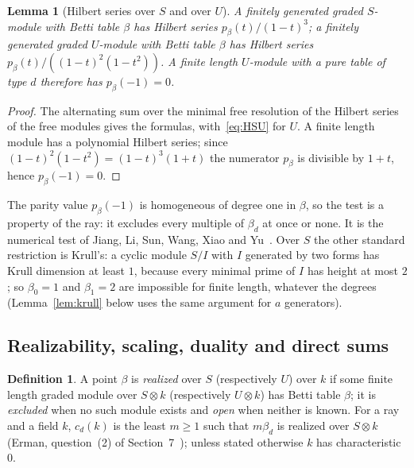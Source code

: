 \documentclass[11pt]{article}
\newtheorem{lemma}{Lemma}
\theoremstyle{definition}
\newtheorem{definition}{Definition}
\theoremstyle{remark}
\begin{document}
\begin{lemma}[Hilbert series over $S$ and over $U$]\label{lem:parity}
A finitely generated graded $S$-module with Betti table $\beta$ has Hilbert series $p_\beta(t)/(1-t)^3$; a finitely generated graded $U$-module with Betti table $\beta$ has Hilbert series $p_\beta(t)/((1-t)^2(1-t^2))$. A finite length $U$-module with a pure table of type $d$ therefore has $p_\beta(-1)=0$.
\end{lemma}
\begin{proof}
The alternating sum over the minimal free resolution of the Hilbert series of the free modules gives the formulas, with~\eqref{eq:HSU} for $U$. A finite length module has a polynomial Hilbert series; since $(1-t)^2(1-t^2)=(1-t)^3(1+t)$ the numerator $p_\beta$ is divisible by $1+t$, hence $p_\beta(-1)=0$.
\end{proof}

The parity value $p_\beta(-1)$ is homogeneous of degree one in $\beta$, so the test is a property of the ray: it excludes every multiple of $\beta_d$ at once or none. It is the numerical test of Jiang, Li, Sun, Wang, Xiao and Yu~\cite{JLSWXY}. Over $S$ the other standard restriction is Krull's: a cyclic module $S/I$ with $I$ generated by two forms has Krull dimension at least $1$, because every minimal prime of $I$ has height at most $2$; so $\beta_0=1$ and $\beta_1=2$ are impossible for finite length, whatever the degrees (Lemma~\ref{lem:krull} below uses the same argument for $a$ generators).

\subsection{Realizability, scaling, duality and direct sums}
\label{sec:realizability}

\begin{definition}
A point $\beta$ is \emph{realized} over $S$ (respectively $U$) over $k$ if some finite length graded module over $S\otimes k$ (respectively $U\otimes k$) has Betti table $\beta$; it is \emph{excluded} when no such module exists and \emph{open} when neither is known. For a ray and a field $k$, $c_d(k)$ is the least $m\ge1$ such that $m\beta_d$ is realized over $S\otimes k$ (Erman, question~(2) of Section~7~\cite{Erman09}); unless stated otherwise $k$ has characteristic $0$.
\end{definition}
\end{document}
